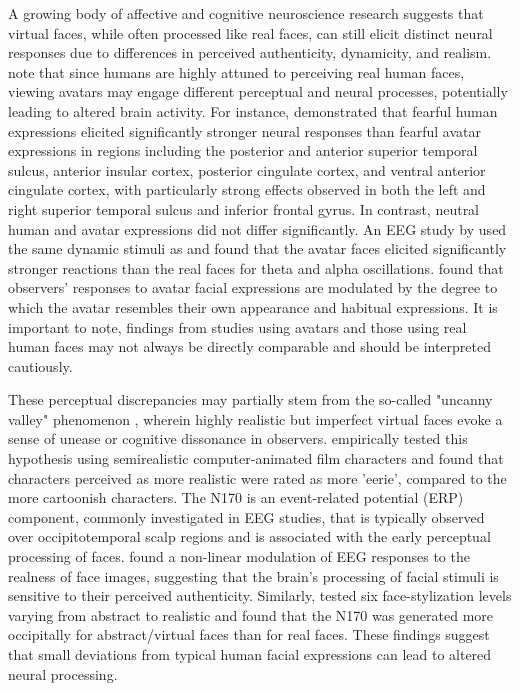 A growing body of affective and cognitive neuroscience research suggests that virtual faces, while often processed like real faces, can still elicit distinct neural responses due to differences in perceived authenticity, dynamicity, and realism.
\cite{de_borst_is_2015} note that since humans are highly attuned to perceiving real human faces, viewing avatars may engage different perceptual and neural processes, potentially leading to altered brain activity. 
For instance, \cite{kegel_dynamic_2020} demonstrated that fearful human expressions elicited significantly stronger neural responses than fearful avatar expressions in regions including the posterior and anterior superior temporal sulcus, anterior insular cortex, posterior cingulate cortex, and ventral anterior cingulate cortex, with particularly strong effects observed in both the left and right superior temporal sulcus and inferior frontal gyrus. 
In contrast, neutral human and avatar expressions did not differ significantly.
An EEG study by \cite{sollfrank_effects_2021} used the same dynamic stimuli as \cite{kegel_dynamic_2020} and found that the avatar faces elicited significantly stronger reactions than the real faces for theta and alpha oscillations.
\cite{park_individuals_2021} found that observers' responses to avatar facial expressions are modulated by the degree to which the avatar resembles their own appearance and habitual expressions.
It is important to note, findings from studies using avatars and those using real human faces may not always be directly comparable and should be interpreted cautiously. 

These perceptual discrepancies may partially stem from the so-called "uncanny valley" phenomenon \citep{mori_uncanny_2012}, wherein highly realistic but imperfect virtual faces evoke a sense of unease or cognitive dissonance in observers. 
\cite{katsyri_testing_2017} empirically tested this hypothesis using semirealistic computer-animated film characters and found that characters perceived as more realistic were rated as more 'eerie', compared to the more cartoonish characters. 
The N170 is an event-related potential (ERP) component, commonly investigated in EEG studies, that is typically observed over occipitotemporal scalp regions and is associated with the early perceptual processing of faces.
\cite{chen_realness_2024} found a non-linear modulation of EEG responses to the realness of face images, suggesting that the brain's processing of facial stimuli is sensitive to their perceived authenticity.
Similarly, \cite{schindler_differential_2017} tested six face-stylization levels varying from abstract to realistic and found that the N170 was generated more occipitally for abstract/virtual faces than for real faces. 
These findings suggest that small deviations from typical human facial expressions can lead to altered neural processing. 

